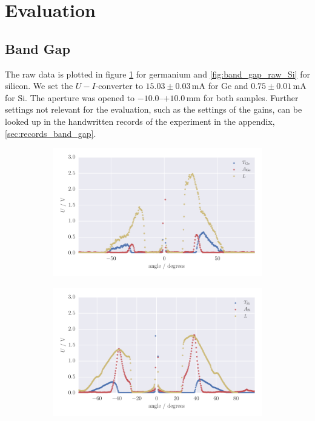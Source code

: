 \section{Evaluation}
\subsection{Band Gap}
The raw data is plotted in figure \ref{fig:band_gap_raw_Ge} for 
germanium and \ref{fig:band_gap_raw_Si} for silicon. 
We set the $U-I$-converter to $15.03 \pm 0.03\,$mA for Ge 
and $0.75 \pm 0.01\,$mA for Si. The aperture was opened to 
$-10.0$--$+10.0\,$mm for both samples. Further settings 
not relevant for the evaluation, such as the settings of the gains, 
can be looked up in the 
handwritten records of the experiment in the appendix, 
\ref{sec:records_band_gap}. 
\begin{figure}
    \centering
    \begin{subfigure}[b]{\pltw}
        \includegraphics[width=1.0\linewidth]{figures/band_gap_raw_Ge}
        \caption{}
        \label{fig:band_gap_raw_Ge}
    \end{subfigure}
    \begin{subfigure}[b]{\pltw}
        \includegraphics[width=1.0\linewidth]{figures/band_gap_raw_Si}

\end{subfigure}
\end{figure}
